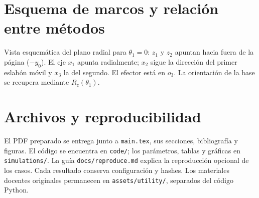 \section{Esquema de marcos y relación entre métodos}
\begin{center}\end{center}
Vista esquemática del plano radial para $\theta_1=0$: $z_1$ y $z_2$ apuntan hacia fuera de la página ($-y_0$). El eje $x_1$ apunta radialmente; $x_2$ sigue la dirección del primer eslabón móvil y $x_3$ la del segundo. El efector está en $o_3$. La orientación de la base se recupera mediante $R_z(\theta_1)$.

\section{Archivos y reproducibilidad}
El PDF preparado se entrega junto a \texttt{main.tex}, sus secciones, bibliografía y figuras. El código se encuentra en \texttt{code/}; los parámetros, tablas y gráficas en \texttt{simulations/}. La guía \texttt{docs/reproduce.md} explica la reproducción opcional de los casos. Cada resultado conserva configuración y hashes. Los materiales docentes originales permanecen en \texttt{assets/utility/}, separados del código Python.
